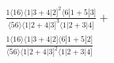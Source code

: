\documentclass[varwidth, border=5pt]{standalone}
\begin{document}
\begin{my}
$\begin{gathered}
\scriptscriptstyle\frac{1⟨16⟩⟨1|3+4|2]^2⟨6|1+5|3]}{⟨56⟩⟨1|2+4|3]^3⟨1|2+3|4]}+\\
\scriptscriptstyle\frac{1⟨16⟩⟨1|3+4|2]⟨6|1+5|2]}{⟨56⟩⟨1|2+4|3]^2⟨1|2+3|4]}\phantom{+}
\end{gathered}$
\end{my}
\end{document}
